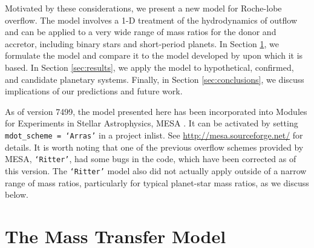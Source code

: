 \documentclass{aastex}
\begin{document}
Motivated by these considerations, we present a new model for Roche-lobe overflow. The model involves a 1-D treatment of the hydrodynamics of outflow and can be applied to a very wide range of mass ratios for the donor and accretor, including binary stars and short-period planets. In Section \ref{sec:model}, we formulate the model and compare it to the model developed by \citet{1988A&A...202...93R} upon which it is based. In Section \ref{sec:results}, we apply the model to hypothetical, confirmed, and candidate planetary systems. Finally, in Section \ref{sec:conclusions}, we discuss implications of our predictions and future work.

As of version 7499, the model presented here has been incorporated into Modules for Experiments in Stellar Astrophysics, MESA \citep{2011ApJS..192....3P, 2013ApJS..208....4P}. It can be activated by setting \texttt{mdot\_scheme = `Arras'} in a project inlist. See \url{http://mesa.sourceforge.net/} for details. It is worth noting that one of the previous overflow schemes provided by MESA, \texttt{`Ritter'}, had some bugs in the code, which have been corrected as of this version. The \texttt{`Ritter'} model also did not actually apply outside of a narrow range of mass ratios, particularly for typical planet-star mass ratios, as we discuss below.

\section{The Mass Transfer Model}
\label{sec:model}
\end{document}
